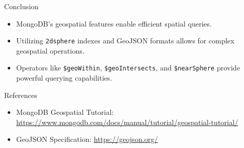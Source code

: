\documentclass[aspectratio=169]{beamer}
\begin{document}

\begin{frame}{Conclusion}
	\begin{itemize}
		\item MongoDB's geospatial features enable efficient spatial queries.
		\item Utilizing \texttt{2dsphere} indexes and GeoJSON formats allows for complex geospatial operations.
		\item Operators like \texttt{\$geoWithin}, \texttt{\$geoIntersects}, and \texttt{\$nearSphere} provide powerful querying capabilities.
	\end{itemize}
\end{frame}

\begin{frame}{References}
	\begin{itemize}
		\item MongoDB Geospatial Tutorial: \url{https://www.mongodb.com/docs/manual/tutorial/geospatial-tutorial/}
		\item GeoJSON Specification: \url{https://geojson.org/}
	\end{itemize}
\end{frame}
\end{document}
